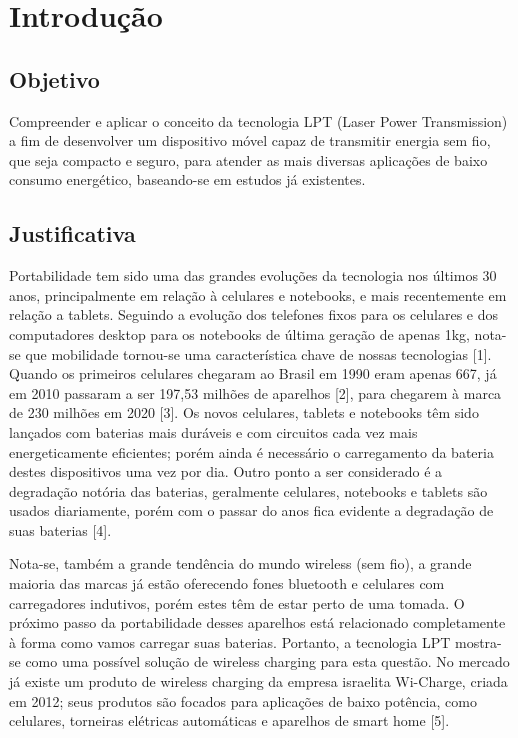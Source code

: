 \documentclass{fei}
\begin{document}
\listoffigures
\listoftables
\tableofcontents

\chapter{Introdução}

\section{Objetivo}

Compreender e aplicar o conceito da tecnologia LPT (Laser Power Transmission) a fim de desenvolver um dispositivo móvel capaz de transmitir energia sem fio, que seja compacto e seguro, para atender as mais diversas aplicações de baixo consumo energético, baseando-se em estudos já existentes.

\section{Justificativa}

Portabilidade tem sido uma das grandes evoluções da tecnologia nos últimos 30 anos, principalmente em relação à celulares e notebooks, e mais recentemente em relação a tablets. Seguindo a evolução dos telefones fixos para os celulares e dos computadores desktop para os notebooks de última geração de apenas 1kg, nota-se que mobilidade tornou-se uma característica chave de nossas tecnologias [1].  Quando os primeiros celulares chegaram ao Brasil em 1990 eram apenas 667, já em 2010 passaram a ser 197,53 milhões de aparelhos [2], para chegarem à marca de 230 milhões em 2020 [3]. Os novos celulares, tablets e notebooks têm sido lançados com baterias mais duráveis e com circuitos cada vez mais energeticamente eficientes; porém ainda é necessário o carregamento da bateria destes dispositivos uma vez por dia. Outro ponto a ser considerado é a degradação notória das baterias, geralmente celulares, notebooks e tablets são usados diariamente, porém com o passar do anos fica evidente a degradação de suas baterias [4].

Nota-se, também a grande tendência do mundo wireless (sem fio), a grande maioria das marcas já estão oferecendo fones bluetooth e celulares com carregadores indutivos, porém estes têm de estar perto de uma tomada. O próximo passo da portabilidade desses aparelhos está relacionado completamente à forma como vamos carregar suas baterias. Portanto, a tecnologia LPT mostra-se como uma possível solução de wireless charging para esta questão. No mercado já existe um produto de wireless charging da empresa israelita Wi-Charge, criada em 2012; seus produtos são focados para aplicações de baixo potência, como celulares, torneiras elétricas automáticas e aparelhos de smart home [5].
\end{document}

